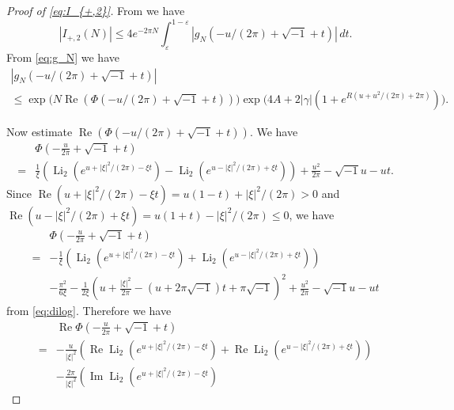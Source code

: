 \documentclass[a4paper]{amsart}
\theoremstyle{plain}
\theoremstyle{definition}
\theoremstyle{remark}
\newcommand{\Li}{\operatorname{Li}}
\renewcommand{\Re}{\operatorname{Re}}
\renewcommand{\Im}{\operatorname{Im}}
\numberwithin{equation}{section}
\begin{document}
\begin{proof}[Proof of \eqref{eq:I_{+,2}}]
From \cite[Equation~(4.6)]{Andersen/Hansen:JKNOT2006} we have
\begin{equation*}
  |I_{+,2}(N)|
  \le
  4e^{-2\pi N}
  \int_{\varepsilon}^{1-\varepsilon}|g_N(-u/(2\pi)+\sqrt{-1}+t)|\,dt.
\end{equation*}
From \eqref{eq:g_N} we have
\begin{multline*}
  |g_N(-u/(2\pi)+\sqrt{-1}+t)|
  \\
  \le
  \exp\bigl(N\Re(\Phi(-u/(2\pi)+\sqrt{-1}+t))\bigr)
  \exp\bigl(4A+2|\gamma|(1+e^{R(u+u^2/(2\pi)+2\pi)})\bigr).
\end{multline*}
\par
Now estimate $\Re(\Phi(-u/(2\pi)+\sqrt{-1}+t))$.
We have
\begin{equation*}
\begin{split}
  &\Phi\left(-\frac{u}{2\pi}+\sqrt{-1}+t\right)
  \\
  =&
  \frac{1}{\xi}
  \left(
    \Li_2(e^{u+|\xi|^2/(2\pi)-\xi t})
    -
    \Li_2(e^{u-|\xi|^2/(2\pi)+\xi t})
  \right)
  +\frac{u^2}{2\pi}-\sqrt{-1}u-ut.
\end{split}
\end{equation*}
Since $\Re(u+|\xi|^2/(2\pi)-\xi t)=u(1-t)+|\xi|^2/(2\pi)>0$ and $\Re(u-|\xi|^2/(2\pi)+\xi t)=u(1+t)-|\xi|^2/(2\pi)\le0$, we have
\begin{equation*}
\begin{split}
  &\Phi\left(-\frac{u}{2\pi}+\sqrt{-1}+t\right)
  \\
  =&
  -\frac{1}{\xi}
  \left(
    \Li_2(e^{u+|\xi|^2/(2\pi)-\xi t})
    +
    \Li_2(e^{u-|\xi|^2/(2\pi)+\xi t})
  \right)
  \\
  &
  -\frac{\pi^2}{6\xi}
  -\frac{1}{2\xi}
  \left(
    u+\frac{|\xi|^2}{2\pi}-(u+2\pi\sqrt{-1})t+\pi\sqrt{-1}
  \right)^2
  +\frac{u^2}{2\pi}-\sqrt{-1}u-ut
\end{split}
\end{equation*}
from \eqref{eq:dilog}.
Therefore we have
\begin{equation*}
\begin{split}
  &\Re\Phi\left(-\frac{u}{2\pi}+\sqrt{-1}+t\right)
  \\
  =&
  -\frac{u}{|\xi|^2}
  \left(
    \Re\Li_2(e^{u+|\xi|^2/(2\pi)-\xi t})
    +
    \Re\Li_2(e^{u-|\xi|^2/(2\pi)+\xi t})
  \right)
  \\
  &-\frac{2\pi}{|\xi|^2}
  \left(
    \Im\Li_2(e^{u+|\xi|^2/(2\pi)-\xi t})

\end{split}
\end{equation*}
\end{proof}
\end{document}
